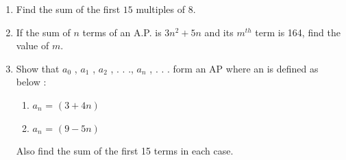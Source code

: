 \begin{enumerate}[label=\thechapter.\arabic*,ref=\thechapter.\theenumi]
\item Find the sum of the first $15$ multiples of $8$. \\

\solution


\item If the sum of $n$ terms of an A.P. is $3n^2+5n$ and its $m^{th}$ term is 164, find the value of $m$.\\
\solution


\item Show that $a_0$ , $a_1$ , $a_2$
, . . ., $a_n$
, . . . form an AP where an is defined as below :
\begin{enumerate}
    \item $a_n$ = $(3 + 4n)$ 
    \item $a_n$ = $(9 - 5n)$ 
\end{enumerate}
Also find the sum of the first 15 terms in each case.
\solution


\end{enumerate}
